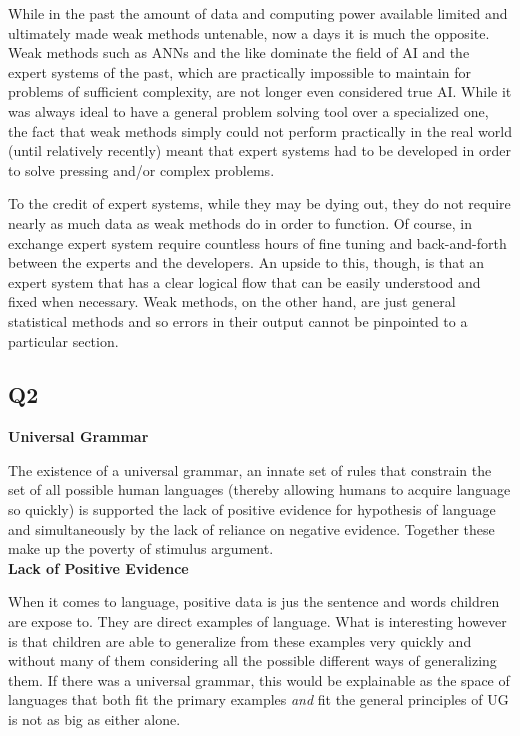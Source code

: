 \documentclass{article}
\begin{document}
While in the past the amount of data and computing power available limited and ultimately made weak methods untenable, now a days it is much the opposite. Weak methods such as ANNs and the like dominate the field of AI and the expert systems of the past, which are practically impossible to maintain for problems of sufficient complexity, are not longer even considered true AI. While it was always ideal to have a general problem solving tool over a specialized one, the fact that weak methods simply could not perform practically in the real world (until relatively recently) meant that expert systems had to be developed in order to solve pressing and/or complex problems.

To the credit of expert systems, while they may be dying out, they do not require nearly as much data as weak methods do in order to function. Of course, in exchange expert system require countless hours of fine tuning and back-and-forth between the experts and the developers. An upside to this, though, is that an expert system that has a clear logical flow that can be easily understood and fixed when necessary. Weak methods, on the other hand, are just general statistical methods and so errors in their output cannot be pinpointed to a particular section.

\subsection*{Q2}
\textbf{Universal Grammar}

The existence of a universal grammar, an innate set of rules that constrain the set of all possible human languages (thereby allowing humans to acquire language so quickly) is supported the lack of positive evidence for hypothesis of language and simultaneously by the lack of reliance on negative evidence. Together these make up the poverty of stimulus argument.\\
\textbf{Lack of Positive Evidence}

When it comes to language, positive data is jus the sentence and words children are expose to. They are direct examples of language. What is interesting however is that children are able to generalize from these examples very quickly and without many of them considering all the possible different ways of generalizing them. If there was a universal grammar, this would be explainable as the space of languages that both fit the primary examples \textit{and} fit the general principles of UG is not as big as either alone.
\end{document}
